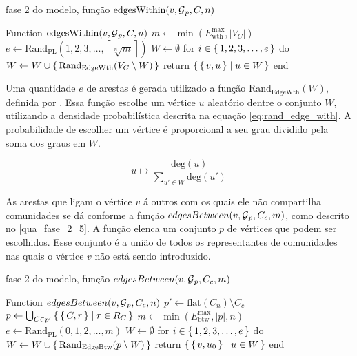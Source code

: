 \documentclass[notes.tex]{subfiles}
\begin{document}
\begin{quadro}[htbp]
\caption{fase 2 do modelo, função $\text{edgesWithin}(v, \operatorname{\mathcal{G}}_p, C, n)$}
\label{qua:fase_2_4}
\begin{algorithm}
Function $\text{edgesWithin}(v, \operatorname{\mathcal{G}}_p, C, n)$
    $m \leftarrow \min( E_\text{wth}^\text{max}, |V_C| )$
    $e \leftarrow \text{Rand}_\text{PL}({1, 2, 3, \ldots, \left\lceil  \sqrt[n]{m} \right\rceil})$
    $W \leftarrow \emptyset$
    for $i \in \set{1, 2, 3, \ldots, e}$ do $W\leftarrow W \cup \set{\text{Rand}_\text{EdgeWth}(V_C \setminus W)}$
    return $\set{\set{v, u} | u \in W}$
end
\end{algorithm}
\end{quadro}

Uma quantidade $e$ de arestas é gerada utilizado a função $\text{Rand}_\text{EdgeWth}(W)$, definida por .
Essa função escolhe um vértice $u$ aleatório dentre o conjunto $W$, utilizando a densidade probabilística descrita na equação \ref{eq:rand_edge_with}.
A probabilidade de escolher um vértice é proporcional a seu grau dividido pela soma dos graus em $W$.

\begin{equation}\label{eq:rand_edge_with}
    u \mapsto \frac{\text{deg}(u)}{\displaystyle\sum_{u' \in W}^{}\text{deg}(u')}
\end{equation}

As arestas que ligam o vértice $v$ á outros com os quais ele não compartilha comunidades se dá conforme a função $edgesBetween(v, \operatorname{\mathcal{G}}_p, C_c, m)$, como descrito no \autoref{qua_fase_2_5}.
A função elenca um conjunto $p$ de vértices que podem ser escolhidos.
Esse conjunto é a união de todos os representantes de comunidades nas quais o vértice $v$ não está sendo introduzido.

\begin{quadro}[htbp]
\caption{fase 2 do modelo, função $edgesBetween(v, \operatorname{\mathcal{G}}_p, C_c, m)$}
\label{qua:fase_2_5}
\begin{algorithm}
Function $edgesBetween(v, \operatorname{\mathcal{G}}_p, C_c, n)$
    $p' \leftarrow \text{flat}(C_n)\setminus C_c$
    $p \leftarrow \bigcup_{C \in p'} \set{\set{C, r} | r \in R_C }$
    $m \leftarrow \min( E_\text{btw}^\text{max}, |p|, n)$
    $e \leftarrow \text{Rand}_\text{PL}({0, 1, 2, \ldots, m})$
    $W \leftarrow \emptyset$
    for $i \in \set{1, 2, 3, \ldots, e}$ do $W\leftarrow W \cup \set{\text{Rand}_\text{EdgeBtw}(p \setminus W)}$
    return $\set{\set{v, u_0} | u \in W}$
end
\end{algorithm}
\end{quadro}
\end{document}

